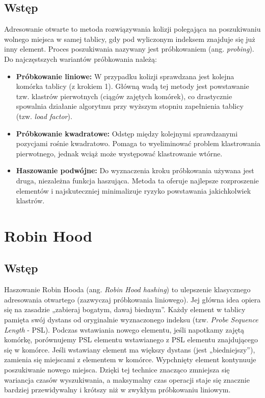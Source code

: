 \documentclass[12pt,a4paper]{article}
\begin{document}
\subsection{Wstęp}
Adresowanie otwarte to metoda rozwiązywania kolizji polegająca na poszukiwaniu wolnego miejsca w samej tablicy, gdy pod wyliczonym indeksem znajduje się już inny element. Proces poszukiwania nazywany jest próbkowaniem (ang. \textit{probing}). Do najczęstszych wariantów próbkowania należą:
\begin{itemize}
    \item \textbf{Próbkowanie liniowe:} W przypadku kolizji sprawdzana jest kolejna komórka tablicy (z krokiem 1). Główną wadą tej metody jest powstawanie tzw. klastrów pierwotnych (ciągów zajętych komórek), co drastycznie spowalnia działanie algorytmu przy wyższym stopniu zapełnienia tablicy (tzw. \textit{load factor}).
    \item \textbf{Próbkowanie kwadratowe:} Odstęp między kolejnymi sprawdzanymi pozycjami rośnie kwadratowo. Pomaga to wyeliminować problem klastrowania pierwotnego, jednak wciąż może występować klastrowanie wtórne.
    \item \textbf{Haszowanie podwójne:} Do wyznaczenia kroku próbkowania używana jest druga, niezależna funkcja haszująca. Metoda ta oferuje najlepsze rozproszenie elementów i najskuteczniej minimalizuje ryzyko powstawania jakichkolwiek klastrów.
\end{itemize}

\section{Robin Hood}
\subsection{Wstęp}
Haszowanie Robin Hooda (ang. \textit{Robin Hood hashing}) to ulepszenie klasycznego adresowania otwartego (zazwyczaj próbkowania liniowego). Jej główna idea opiera się na zasadzie „zabieraj bogatym, dawaj biednym”. Każdy element w tablicy pamięta swój dystans od oryginalnie wyznaczonego indeksu (tzw. \textit{Probe Sequence Length} - PSL). 
Podczas wstawiania nowego elementu, jeśli napotkamy zajętą komórkę, porównujemy PSL elementu wstawianego z PSL elementu znajdującego się w komórce. Jeśli wstawiany element ma większy dystans (jest „biedniejszy”), zamienia się miejscami z elementem w komórce. Wypchnięty element kontynuuje poszukiwanie nowego miejsca. Dzięki tej technice znacząco zmniejsza się wariancja czasów wyszukiwania, a maksymalny czas operacji staje się znacznie bardziej przewidywalny i krótszy niż w zwykłym próbkowaniu liniowym.
\end{document}
